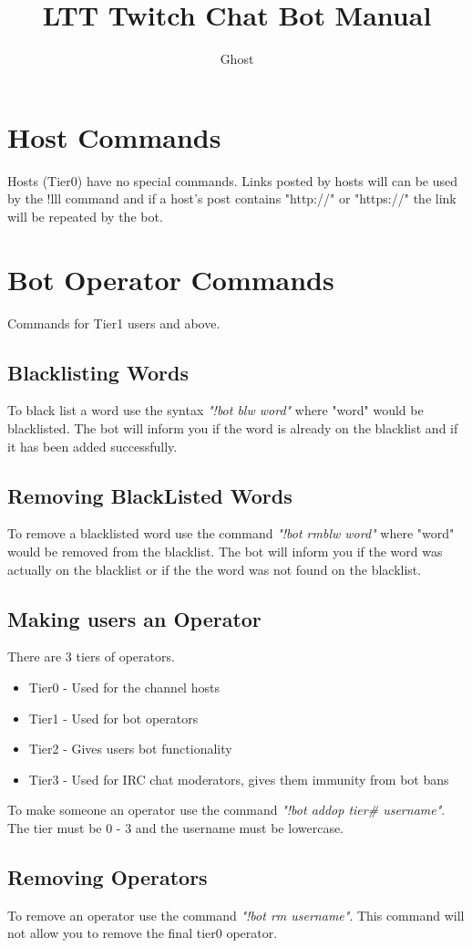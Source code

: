 \documentclass[10pt]{article}
\author{Ghost}
\title{LTT Twitch Chat Bot Manual}
\begin{document}
\maketitle
\tableofcontents
\section{Host Commands}
Hosts (Tier0) have no special commands. Links posted by hosts will can be used by the !lll command and if a host's post contains "http://" or "https://" the link will be repeated by the bot. 
\section{Bot Operator Commands}
Commands for Tier1 users and above.
\subsection{Blacklisting Words}
To black list a word use the syntax \emph{"!bot blw word"} where "word" would be blacklisted. The bot will inform you if the word is already on the blacklist and if it has been added successfully.
\subsection{Removing BlackListed Words}
To remove a blacklisted word use the command \emph{"!bot rmblw word"} where "word" would be removed from the blacklist. The bot will inform you if the word was actually on the blacklist or if the the word was not found on the blacklist.
\subsection{Making users an Operator}
There are 3 tiers of operators.
\begin{itemize}
\item {Tier0 - Used for the channel hosts}
\item {Tier1 - Used for bot operators}
\item {Tier2 - Gives users bot functionality}
\item {Tier3 - Used for IRC chat moderators, gives them immunity from bot bans}
\end{itemize}
To make someone an operator use the command \emph{"!bot addop tier\# username"}. The tier must be 0 - 3 and the username must be lowercase.
\subsection{Removing Operators}
To remove an operator use the command \emph{"!bot rm username"}. This command will not allow you to remove the final tier0 operator.
\end{document}
